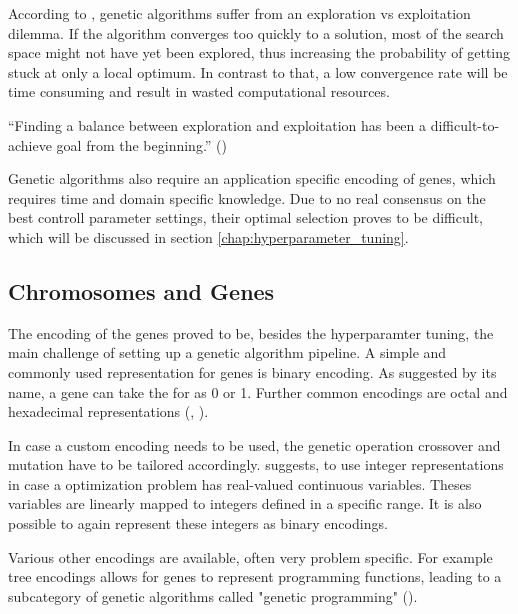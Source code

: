 According to \cite{hussain_trade-off_2020}, genetic algorithms suffer from an exploration vs exploitation dilemma. If the algorithm converges too quickly to a solution, most of the search space might not have yet been explored, thus increasing the probability of getting stuck at only a local optimum.
In contrast to that, a low convergence rate will be time consuming and result in wasted computational resources.

\enquote{Finding a balance between exploration and exploitation has been a difficult-to-achieve goal from the beginning.} (\cite{kacprzyk_parameter_2007})

Genetic algorithms also require an application specific encoding of genes, which requires time and domain specific knowledge. Due to no real consensus on the best controll parameter settings, their optimal selection proves to be difficult, which will be discussed in section \ref{chap:hyperparameter_tuning}.

\subsection{Chromosomes and Genes}
\label{chap:foundation:ga:encoding}


The encoding of the genes proved to be, besides the hyperparamter tuning, the main challenge of setting up a genetic algorithm pipeline.
A simple and commonly used representation for genes is binary encoding. As suggested by its name, a gene can take the for as 0 or 1. Further common encodings are octal and hexadecimal representations (\cite{srinivas_genetic_1994}, \cite{katoch_review_2021}).

In case a custom encoding needs to be used, the genetic operation crossover and mutation have to be tailored accordingly. \cite{srinivas_genetic_1994} suggests, to use integer representations in case a optimization problem has real-valued continuous variables. Theses variables are linearly mapped to integers defined in a specific range. It is also possible to again represent these integers as binary encodings.

Various other encodings are available, often very problem specific. For example tree encodings allows for genes to represent programming functions, leading to a subcategory of genetic algorithms called "genetic programming" (\cite{katoch_review_2021}).


